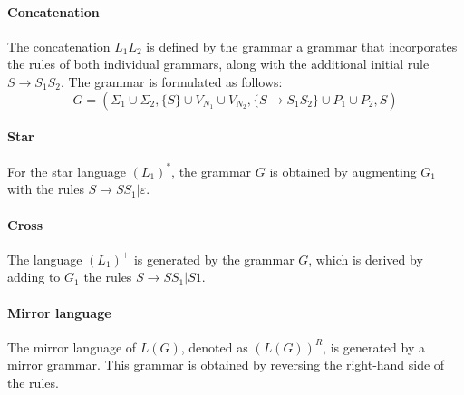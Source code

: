 \paragraph*{Concatenation}
The concatenation $L_1L_2$ is defined by the grammar a grammar that incorporates the rules of both individual grammars, along with the additional initial rule $S\rightarrow S_1S_2$.
The grammar is formulated as follows:
\[G=\left(\Sigma_1 \cup \Sigma_2,\{S\} \cup V_{N_1} \cup V_{N_2},\{S\rightarrow S_1S_2\} \cup P_1 \cup P_2,S\right)\] 

\paragraph*{Star}
For the star language $(L_1)^{*}$, the grammar $G$ is obtained by augmenting $G_1$ with the rules $S \rightarrow SS_1|\varepsilon$.

\paragraph*{Cross}
The language $(L_1)^{+}$ is generated by the grammar $G$, which is derived by adding to $G_1$ the rules $S \rightarrow SS_1|S1$.

\paragraph*{Mirror language}
The mirror language of $L(G)$, denoted as $(L(G))^R$, is generated by a mirror grammar. This grammar is obtained by reversing the right-hand side of the rules.